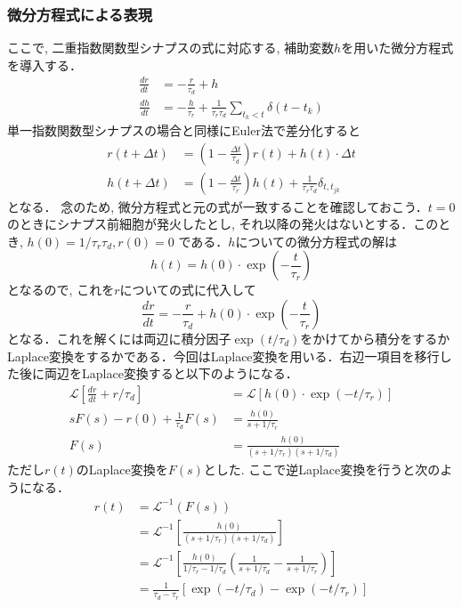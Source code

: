 \subsubsection{微分方程式による表現}
ここで, 二重指数関数型シナプスの式に対応する, 補助変数$h$を用いた微分方程式を導入する． 
\begin{align} 
\frac{dr}{dt}&=-\frac{r}{\tau_{d}}+h\\
\frac{dh}{dt}&=-\frac{h}{\tau_{r}}+\frac{1}{\tau_{r} \tau_{d}} \sum_{t_{k}< t} \delta\left(t-t_{k}\right) 
\end{align} 
単一指数関数型シナプスの場合と同様にEuler法で差分化すると 
\begin{align} 
r(t+\Delta t)&=\left(1-\frac{\Delta t}{\tau_{d}}\right)r(t)+h(t)\cdot \Delta t\\ 
h(t+\Delta t)&=\left(1-\frac{\Delta t}{\tau_{r}}\right)h(t)+\frac{1}{\tau_{r}\tau_{d}} \delta_{t,t_{j k}}
\end{align}
となる．
念のため, 微分方程式と元の式が一致することを確認しておこう．$t=0$のときにシナプス前細胞が発火したとし, それ以降の発火はないとする．このとき, $h(0)=1/\tau_{r}\tau_{d}, r(0)=0$ である．$h$についての微分方程式の解は
\begin{equation}
h(t)=h(0)\cdot \exp\left(-\frac{t}{\tau_r}\right)    
\end{equation}
となるので, これを$r$についての式に代入して
\begin{equation}
\frac{dr}{dt}=-\frac{r}{\tau_{d}}+h(0)\cdot \exp\left(-\frac{t}{\tau_r}\right) 
\end{equation}
となる．これを解くには両辺に積分因子$\exp({t}/{\tau_d})$をかけてから積分をするかLaplace変換をするかである．今回はLaplace変換を用いる．右辺一項目を移行した後に両辺をLaplace変換すると以下のようになる．
\begin{align}
\mathcal{L}\left[\frac{dr}{dt}+r/\tau_{d}\right]&=\mathcal{L}\left[h(0)\cdot \exp\left(-t/\tau_r\right)\right]\\
sF(s)-r(0)+\frac{1}{\tau_{d}}F(s)&=\frac{h(0)}{s+1/\tau_r}\\
F(s)&=\frac{h(0)}{(s+1/\tau_r)(s+1/\tau_d)}
\end{align}
ただし$r(t)$のLaplace変換を$F(s)$とした. ここで逆Laplace変換を行うと次のようになる．
\begin{align}
r(t)&=\mathcal{L}^{-1}(F(s))\\
&=\mathcal{L}^{-1}\left[\frac{h(0)}{(s+1/\tau_r)(s+1/\tau_d)}\right]\\
&=\mathcal{L}^{-1}\left[\frac{h(0)}{1/\tau_r-1/\tau_d}\left(\frac{1}{s+1/\tau_d}-\frac{1}{s+1/\tau_r}\right)\right]\\
&=\frac{1}{\tau_d-\tau_r}\left[\exp(-t/\tau_d)-\exp(-t/\tau_r)\right]
\end{align}
